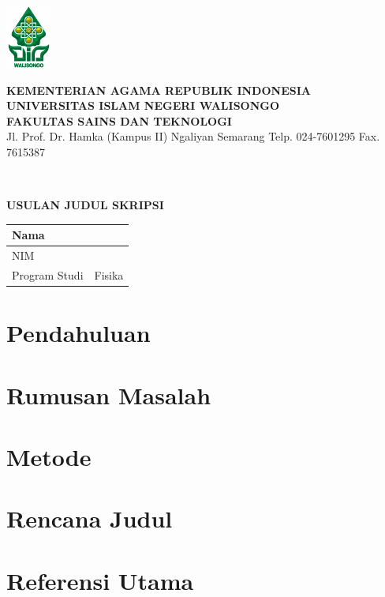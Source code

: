 \documentclass[12pt]{article}
\begin{document}
\noindent
\begin{minipage}{0.1\textwidth}
\centering
\includegraphics[width=1.5cm]{logo-uin-ws.png}
\end{minipage}
\begin{minipage}{0.9\textwidth}
\begin{center}
{\large\bf KEMENTERIAN AGAMA REPUBLIK INDONESIA}\\[4pt]
{\large\bf UNIVERSITAS ISLAM NEGERI WALISONGO}\\[4pt]
{\large\bf FAKULTAS SAINS DAN TEKNOLOGI}\\
{\small Jl. Prof. Dr. Hamka (Kampus II) Ngaliyan Semarang Telp. 024-7601295 Fax. 7615387}
\end{center}
\end{minipage}

\noindent\makebox[\linewidth]{\rule{\textwidth}{0.4pt}}\\
\begin{center}
{\bf USULAN JUDUL SKRIPSI}
\end{center}

\def\arraystretch{1.5}%
\noindent
\begin{tabular}{|m{}|m{}|}
\hline
Nama  & \\
\hline
NIM   & \\
\hline
Program Studi & Fisika\\
\hline
\end{tabular}

\section{Pendahuluan}
\lipsum[1-4]
\section{Rumusan Masalah}
\lipsum[1-4]
\section{Metode}
\lipsum[1-4]
\section{Rencana Judul}
\lipsum[1-4]
\section{Referensi Utama}
\lipsum[1-4]
\end{document}
